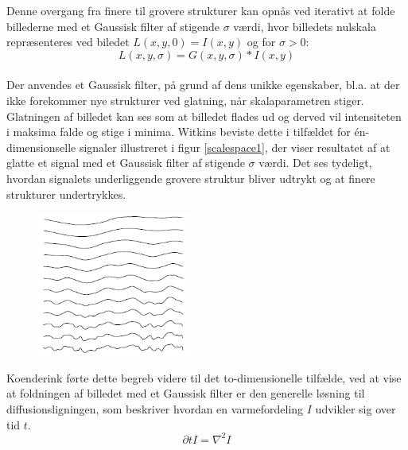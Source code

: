 Denne overgang fra finere til grovere strukturer kan opnås ved iterativt at folde billederne med et Gaussisk filter af stigende $\sigma$ værdi, hvor billedets nulskala repræsenteres ved biledet $ L(x,y,0) = I(x,y)$ og for $\sigma>0$:
\begin{equation}
L(x,y,\sigma) = G(x,y,\sigma)\ast I(x,y)
\label{scalespace1}
\end{equation}
\\
Der anvendes et Gaussisk filter, på grund af dens unikke egenskaber,  bl.a. at der ikke forekommer nye strukturer ved glatning, når skalaparametren stiger. Glatningen af billedet kan ses som at billedet flades ud og derved vil intensiteten i maksima falde og stige i minima.  Witkins \cite{witkins} beviste dette i tilfældet for én-dimensionselle signaler illustreret i  figur  \ref{scalespace1}, der viser resultatet af at glatte et signal med et Gaussisk filter af stigende $\sigma$ værdi. Det ses tydeligt, hvordan signalets underliggende grovere struktur bliver udtrykt og at finere strukturer undertrykkes.
\begin{figure}[H]
    \centering
    \includegraphics[width=0.45\textwidth]{fig/33.png}
     \vspace{-1em}
    \begin{center}    
       \caption{\textcolor{gray}{\footnotesize \textit{ }}}
    \label{fig:scalereps}
     \end{center}
     \vspace{-2.5em}
  \end{figure} \noindent
Koenderink \cite{koen} førte dette begreb videre til det to-dimensionelle tilfælde, ved at vise at foldningen af billedet med et Gaussisk filter er den generelle løsning til diffusionsligningen, som beskriver hvordan en varmefordeling $I$ udvikler sig over tid $t$.
$$ \partial t I = \nabla^2I $$
